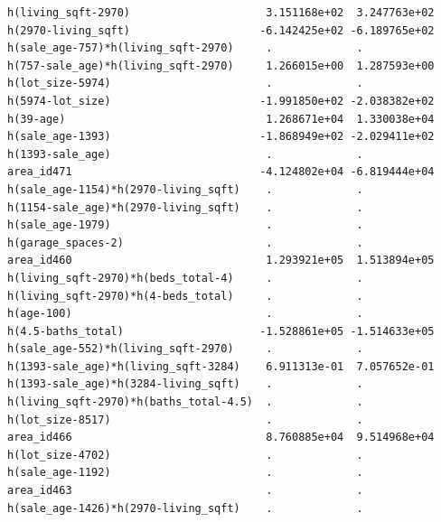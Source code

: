 \documentclass[
]{article}
\begin{document}
\begin{verbatim}
h(living_sqft-2970)                     3.151168e+02  3.247763e+02
h(2970-living_sqft)                    -6.142425e+02 -6.189765e+02
h(sale_age-757)*h(living_sqft-2970)     .             .           
h(757-sale_age)*h(living_sqft-2970)     1.266015e+00  1.287593e+00
h(lot_size-5974)                        .             .           
h(5974-lot_size)                       -1.991850e+02 -2.038382e+02
h(39-age)                               1.268671e+04  1.330038e+04
h(sale_age-1393)                       -1.868949e+02 -2.029411e+02
h(1393-sale_age)                        .             .           
area_id471                             -4.124802e+04 -6.819444e+04
h(sale_age-1154)*h(2970-living_sqft)    .             .           
h(1154-sale_age)*h(2970-living_sqft)    .             .           
h(sale_age-1979)                        .             .           
h(garage_spaces-2)                      .             .           
area_id460                              1.293921e+05  1.513894e+05
h(living_sqft-2970)*h(beds_total-4)     .             .           
h(living_sqft-2970)*h(4-beds_total)     .             .           
h(age-100)                              .             .           
h(4.5-baths_total)                     -1.528861e+05 -1.514633e+05
h(sale_age-552)*h(living_sqft-2970)     .             .           
h(1393-sale_age)*h(living_sqft-3284)    6.911313e-01  7.057652e-01
h(1393-sale_age)*h(3284-living_sqft)    .             .           
h(living_sqft-2970)*h(baths_total-4.5)  .             .           
h(lot_size-8517)                        .             .           
area_id466                              8.760885e+04  9.514968e+04
h(lot_size-4702)                        .             .           
h(sale_age-1192)                        .             .           
area_id463                              .             .           
h(sale_age-1426)*h(2970-living_sqft)    .             .           
                                                                  

\end{verbatim}
\end{document}
